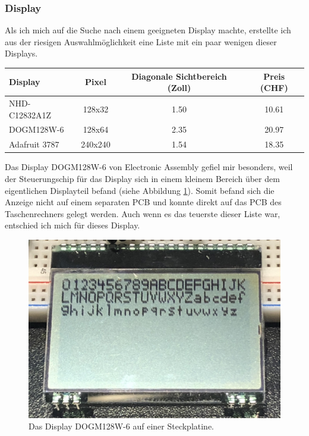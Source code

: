 \documentclass[12pt, a4paper]{report}
\begin{document}
\subsubsection{Display}
Als ich mich auf die Suche nach einem geeigneten Display machte, erstellte ich aus der riesigen Auswahlmöglichkeit eine Liste mit ein paar wenigen dieser Displays.
\newpage
\begin{table}[H]
\begin{tabular}{|l|c|c|c|}
\hline
\textbf{Display} & \textbf{Pixel} & \textbf{Diagonale Sichtbereich (Zoll)} & \textbf{Preis (CHF)} \footnotemark \\
\hline
NHD-C12832A1Z & 128x32 & 1.50 & 10.61 \\
\hline
DOGM128W-6 & 128x64 & 2.35 & 20.97 \\
\hline
Adafruit 3787 & 240x240 & 1.54 & 18.35 \\
\hline
\end{tabular}
\end{table}
\noindent
Das Display DOGM128W-6 von Electronic Assembly gefiel mir besonders, weil der Steuerungschip für das Display sich in einem kleinem Bereich über dem eigentlichen Displayteil befand (siehe Abbildung \ref{fig:dogm_demo}). Somit befand sich die Anzeige nicht auf einem separaten PCB und konnte direkt auf das PCB des Taschenrechners gelegt werden. Auch wenn es das teuerste dieser Liste war, entschied ich mich für dieses Display.
\begin{figure}[H]
\centering
\includegraphics[width=0.3\linewidth]{assets/dogm128.jpg}
\caption{Das Display DOGM128W-6 auf einer Steckplatine.}
\label{fig:dogm_demo}
\end{figure}
\end{document}

